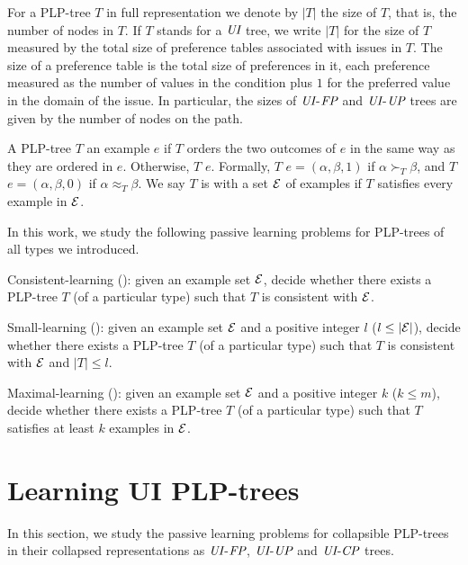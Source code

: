 For a PLP-tree $T$ in full representation we denote by $|T|$ the size of $T$, 
that is, the number of nodes in $T$. If $T$ stands for a $\textit{UI}$ tree, we write $|T|$ for
the size of $T$ measured by the total size of preference tables associated
with issues in $T$. The size of a preference table is the total size of
preferences in it, each preference measured as the number of values in the condition
plus $1$ for the preferred value in the domain of the issue.
In particular, the sizes of $\textit{UI}$-$\textit{FP}$ and $\textit{UI}$-$\textit{UP}$ trees are
given by the number of nodes on the path. 

A PLP-tree $T$  an example $e$ if $T$ orders the two 
outcomes of $e$ in the same way as they are ordered in $e$. Otherwise,
$T$  $e$. Formally, $T$  $e=(\alpha,\beta,1)$
if $\alpha \succ_T \beta$, and $T$  $e=(\alpha,\beta,0)$ if
$\alpha \approx_T \beta$. We say $T$ is  with a set $\mathcal{E}$ 
of examples if $T$ satisfies every example in $\mathcal{E}$.

In this work, we study the following passive learning problems for PLP-trees 
of all types we introduced.
\begin{definition}
Consistent-learning (): given an example set $\mathcal{E}$, decide 
whether there exists a PLP-tree $T$ (of a particular type) such that $T$ 
is consistent with $\mathcal{E}$.
\end{definition}

\begin{definition}
Small-learning (): given an example set $\mathcal{E}$
and a positive integer $l$ ($l \leq |\mathcal{E}|$), decide whether there 
exists a PLP-tree $T$ (of a particular type) such that $T$ is consistent 
with $\mathcal{E}$ and $|T| \leq l$.
\end{definition}

\begin{definition}
Maximal-learning (): given an example set $\mathcal{E}$ and a 
positive integer $k$ ($k \leq m$), decide whether there exists a PLP-tree 
$T$ (of a particular type) such that $T$ satisfies at least $k$ examples 
in $\mathcal{E}$.
\end{definition}


\section{Learning UI PLP-trees}
In this section, we study the passive learning problems for collapsible 
PLP-trees in their collapsed representations as $\textit{UI}$-$\textit{FP}$, $\textit{UI}$-$\textit{UP}$ and
$\textit{UI}$-$\textit{CP}$ trees.


